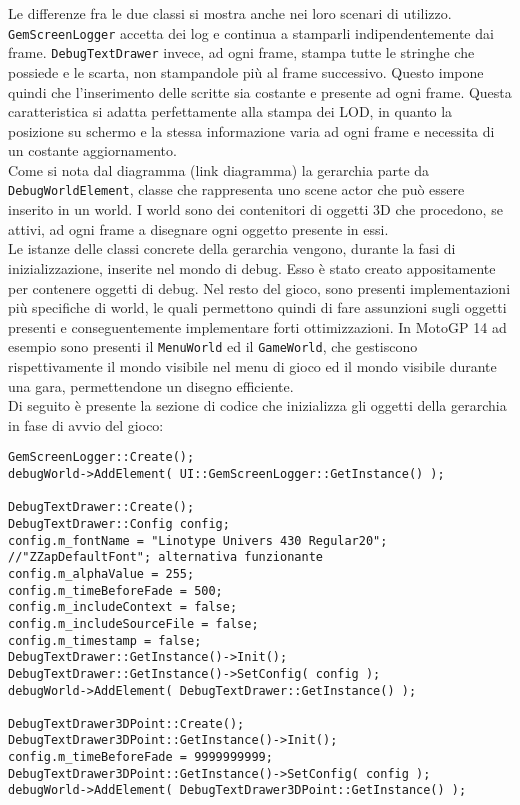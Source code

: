 Le differenze fra le due classi si mostra anche nei loro scenari di utilizzo. \texttt{GemScreenLogger} accetta dei log e continua a stamparli indipendentemente dai frame. \texttt{DebugTextDrawer} invece, ad ogni frame, stampa tutte le stringhe che possiede e le scarta, non stampandole più al frame successivo. Questo impone quindi che l'inserimento delle scritte sia costante e presente ad ogni frame. Questa caratteristica si adatta perfettamente alla stampa dei LOD, in quanto la posizione su schermo e la stessa informazione varia ad ogni frame e necessita di un costante aggiornamento.\\ 

Come si nota dal diagramma (link diagramma) la gerarchia parte da \texttt{DebugWorldElement}, classe che rappresenta uno scene actor che può essere inserito in un world. I world sono dei contenitori di oggetti 3D che procedono, se attivi, ad ogni frame a disegnare ogni oggetto presente in essi.\\

Le istanze delle classi concrete della gerarchia vengono, durante la fasi di inizializzazione, inserite nel mondo di debug. Esso è stato creato appositamente per contenere oggetti di debug. Nel resto del gioco, sono presenti implementazioni più specifiche di world, le quali permettono quindi di fare assunzioni sugli oggetti presenti e conseguentemente implementare forti ottimizzazioni. In MotoGP 14 ad esempio sono presenti il \texttt{MenuWorld} ed il \texttt{GameWorld}, che gestiscono rispettivamente il mondo visibile nel menu di gioco ed il mondo visibile durante una gara, permettendone un disegno efficiente.\\

Di seguito è presente la sezione di codice che inizializza gli oggetti della gerarchia in fase di avvio del gioco:

\begin{lstlisting}[style=maurizio-code, caption=Inizializzazione delle classi responsabili della stampa di testo, label={code:initTextClasses}]
GemScreenLogger::Create();
debugWorld->AddElement( UI::GemScreenLogger::GetInstance() );

DebugTextDrawer::Create();
DebugTextDrawer::Config config;
config.m_fontName = "Linotype Univers 430 Regular20"; //"ZZapDefaultFont"; alternativa funzionante
config.m_alphaValue = 255;
config.m_timeBeforeFade = 500;
config.m_includeContext = false;
config.m_includeSourceFile = false;
config.m_timestamp = false;
DebugTextDrawer::GetInstance()->Init();
DebugTextDrawer::GetInstance()->SetConfig( config );
debugWorld->AddElement( DebugTextDrawer::GetInstance() );

DebugTextDrawer3DPoint::Create();
DebugTextDrawer3DPoint::GetInstance()->Init();
config.m_timeBeforeFade = 9999999999;
DebugTextDrawer3DPoint::GetInstance()->SetConfig( config );
debugWorld->AddElement( DebugTextDrawer3DPoint::GetInstance() );
\end{lstlisting}


